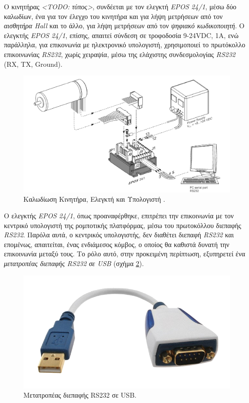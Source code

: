 Ο κινητήρας \textit{<TODO: τύπος>}, συνδέεται με τον ελεγκτή \textit{EPOS 24/1}, μέσω δύο καλωδίων, ένα για τον έλεγχο του κινητήρα και για λήψη μετρήσεων από τον \textit{αισθητήρα Hall} και το άλλο, για λήψη μετρήσεων από τον \textit{ψηφιακό κωδικοποιητή}. Ο ελεγκτής \textit{EPOS 24/1}, επίσης, απαιτεί σύνδεση σε τροφοδοσία 9-24VDC, 1Α, ενώ παράλληλα, για επικονωνία με ηλεκτρονικό υπολογιστή, χρησιμοποιεί το πρωτόκολλο επικοινωνίας \textit{RS232}, χωρίς χειραψία, μέσω της ελάχιστης συνδεσμολογίας \textit{RS232} (RX, TX, Ground).

\begin{figure}[!ht]
		\centering
		\includegraphics[width=0.7\linewidth]{Chapters/Chapter2/Figures/motor_minimum_wiring.png}
		\caption{Καλωδίωση Κινητήρα, Ελεγκτή και Υπολογιστή \cite{epos241_manual}.}
		\label{fig:motor_minimum_wiring}
\end{figure}

O ελεγκτής \textit{EPOS 24/1}, όπως προαναφέρθηκε, επιτρέπει την επικοινωνία με τον κεντρικό υπολογιστή της ρομποτικής πλατφόρμας, μέσω του πρωτοκόλλου διεπαφής \textit{RS232}. Παρόλα αυτά, ο κεντρικός υπολογιστής, δεν διαθέτει διεπαφή \textit{RS232} και επομένως, απαιτείται, ένας ενδιάμεσος κόμβος, ο οποίος θα καθιστά δυνατή την επικοινωνία μεταξύ τους. Το ρόλο αυτό, στην προκειμένη περίπτωση, εξυπηρετεί ένα \textit{μετατροπέας διεπαφής RS232 σε USB} (σχήμα \ref{fig:rs232_to_usb_adapter}).

\begin{figure}[!ht]
		\centering
		\includegraphics[width=.35\linewidth]{Chapters/Chapter2/Figures/rs232_to_usb_adapter.png}
		\caption{Μετατροπέας διεπαφής RS232 σε USB.}
		\label{fig:rs232_to_usb_adapter}
\end{figure}

